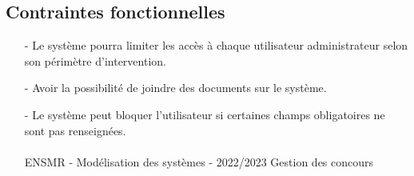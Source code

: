 \subsection{Contraintes fonctionnelles}
\setlength{\parindent}{5ex} 
\begin{itemize}
  \item[-] Le système pourra limiter les accès à chaque utilisateur administrateur selon son périmètre d’intervention. \\[0.1cm]
  \item[-] Avoir la possibilité de joindre des documents sur le système.\\[0.1cm]
  \item[-] Le système peut bloquer l’utilisateur si certaines champs obligatoires ne sont pas renseignées. \\[0.1cm]
  \vfill
\noindent\makebox[\linewidth]{\rule{.8\paperwidth}{.6pt}}\\[0.2cm]
ENSMR - Modélisation des systèmes - 2022/2023 \hfill Gestion des concours
\noindent\makebox[\linewidth]{\rule{.8\paperwidth}{.6pt}}

\end{itemize}


\newpage